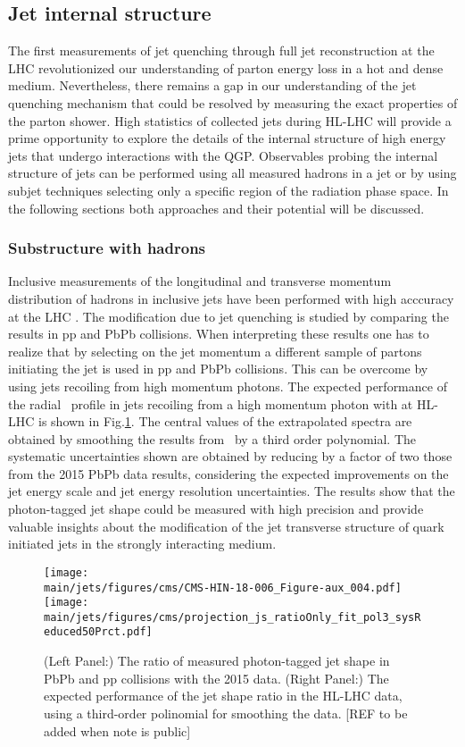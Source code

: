 \subsection{Jet internal structure}\label{sec:jetsub}
The first measurements of jet quenching through full jet reconstruction at the LHC revolutionized our understanding of parton energy loss in a hot and dense medium. Nevertheless, there remains a gap in our understanding of the jet quenching mechanism that could be resolved by measuring the exact properties of the parton shower. High statistics of collected jets during HL-LHC will provide a prime opportunity to explore the details of the internal structure of high energy jets that undergo interactions with the QGP. Observables probing the internal structure of jets can be performed using all measured hadrons in a jet or by using subjet techniques selecting only a specific region of the radiation phase space. In the following sections both approaches and their potential will be discussed.

\subsubsection{Substructure with hadrons}
Inclusive measurements of the longitudinal and transverse momentum distribution of hadrons in inclusive jets have been performed with high acccuracy at the LHC \cite{Aaboud:2018hpb,Sirunyan:2018jqr}. The modification due to jet quenching is studied by comparing the results in pp and PbPb collisions. When interpreting these results one has to realize that by selecting on the jet momentum a different sample of partons initiating the jet is used in pp and PbPb collisions. This can be overcome by using jets recoiling from high momentum photons. The expected performance of the radial \pT\ profile in jets recoiling from a high momentum photon with at HL-LHC is shown in Fig.\ref{fig:jetshape}. The central values of the extrapolated spectra are obtained by smoothing the results from~\cite{Sirunyan:2018ncy} by a third order polynomial. The systematic uncertainties shown are obtained by reducing by a factor of two those from the 2015 PbPb data results, considering the expected improvements on the jet energy scale and jet energy resolution uncertainties. The results show that the photon-tagged jet shape could be measured with high precision and provide valuable insights about the modification of the jet transverse structure of quark initiated jets in the strongly interacting medium.
%
\begin{figure}[!ht]
\begin{center}
\texttt{[image: \\main/jets/figures/cms/CMS-HIN-18-006\_Figure-aux\_004.pdf]}
\texttt{[image: \\main/jets/figures/cms/projection\_js\_ratioOnly\_fit\_pol3\_sysReduced50Prct.pdf]}
\caption{(Left Panel:) The ratio of measured photon-tagged jet shape in PbPb and pp collisions with the 2015 data. (Right Panel:) The expected performance of the jet shape ratio in the HL-LHC data, using a third-order polinomial for smoothing the data. [REF to be added when note is public]}
\label{fig:jetshape}
\end{center}
\end{figure}

